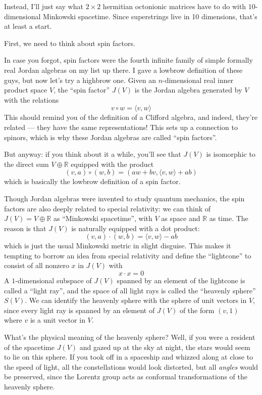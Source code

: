 \documentclass{article}
\begin{document}
Instead, I'll just say what \(2\times2\) hermitian octonionic matrices
have to do with \(10\)-dimensional Minkowski spacetime. Since
superstrings live in 10 dimensions, that's at least a start.

First, we need to think about spin factors.

In case you forgot, spin factors were the fourth infinite family of
simple formally real Jordan algebras on my list up there. I gave a
lowbrow definition of these guys, but now let's try a highbrow one.
Given an \(n\)-dimensional real inner product space \(V\), the ``spin
factor'' \(J(V)\) is the Jordan algebra generated by \(V\) with the
relations \[v\circ w = \langle v,w\rangle\] This should remind you of
the definition of a Clifford algebra, and indeed, they're related ---
they have the same representations! This sets up a connection to
spinors, which is why these Jordan algebras are called ``spin factors''.

But anyway: if you think about it a while, you'll see that \(J(V)\) is
isomorphic to the direct sum \(V\oplus\mathbb{R}\) equipped with the
product \[(v,a)\circ(w,b) = (aw + bv, \langle v,w\rangle + ab)\] which
is basically the lowbrow definition of a spin factor.

Though Jordan algebras were invented to study quantum mechanics, the
spin factors are also deeply related to special relativity: we can think
of \(J(V) = V\oplus\mathbb{R}\) as ``Minkowski spacetime'', with \(V\)
as space and \(\mathbb{R}\) as time. The reason is that \(J(V)\) is
naturally equipped with a dot product:
\[(v,a)\cdot(w,b) = \langle v,w\rangle - ab\] which is just the usual
Minkowski metric in slight disguise. This makes it tempting to borrow an
idea from special relativity and define the ``lightcone'' to consist of
all nonzero \(x\) in \(J(V)\) with \[x\cdot x = 0\] A \(1\)-dimensional
subspace of \(J(V)\) spanned by an element of the lightcone is called a
``light ray'', and the space of all light rays is called the ``heavenly
sphere'' \(S(V)\). We can identify the heavenly sphere with the sphere
of unit vectors in \(V\), since every light ray is spanned by an element
of \(J(V)\) of the form \((v,1)\) where \(v\) is a unit vector in \(V\).

What's the physical meaning of the heavenly sphere? Well, if you were a
resident of the spacetime \(J(V)\) and gazed up at the sky at night, the
stars would seem to lie on this sphere. If you took off in a spaceship
and whizzed along at close to the speed of light, all the constellations
would look distorted, but all \emph{angles} would be preserved, since
the Lorentz group acts as conformal transformations of the heavenly
sphere.
\end{document}
